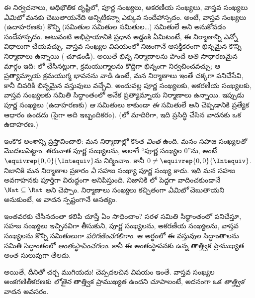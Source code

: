 \documentclass[../../../include/open-logic-section]{subfiles}
\begin{document}
ఈ నిర్వచనాలు, అధిభౌతిక దృష్టిలో, పూర్ణ సంఖ్యలు, అకరణీయ సంఖ్యలు,
వాస్తవ సంఖ్యలు \emph{ఏమిటో} మనకు చెబుతాయనేది అన్నిటికన్నా ఎక్కువ
సందేహాస్పదం. అంటే, వాస్తవ సంఖ్యలు (ఉదాహరణకు) కొన్ని (సమితుల సమితుల
సమితుల\ldots) సమితులే అని అనుకోవడం సందేహాస్పదం. అటువంటి అభిప్రాయానికి
ప్రధాన అడ్డంకి ఏమిటంటే, ఈ నిర్మాణాన్ని ఎన్నో విధాలుగా
చేయవచ్చు. వాస్తవ సంఖ్యల విషయంలో నిజంగానే ఆసక్తికరంగా భిన్నమైన కొన్ని
నిర్మాణాలు ఉన్నాయి ( చూడండి). అయితే భిన్న నిర్మాణాలను
పొందే అతి సాధారణమైన మార్గం ఇది: లో
చేసినట్లుగా, క్రమయుగ్మాలను కొద్దిగా భిన్నంగా నిర్వచించవచ్చు; ఆ ప్రత్యామ్నాయ
క్రమయుగ్మ భావనను వాడి ఉంటే, మన నిర్మాణాలు ఇంతే చక్కగా పనిచేసేవి,
కానీ చివరికి భిన్నమైన వస్తువులు వచ్చేవి. అందువల్ల పూర్ణ సంఖ్యలకు, అకరణీయ సంఖ్యలకు,
వాస్తవ సంఖ్యలకు సమితి సిద్ధాంతంలో అనేక ప్రత్యామ్నాయ నిర్మాణాలు ఉన్నాయి. ఇప్పుడు
పూర్ణ సంఖ్యలు (ఉదాహరణకు) \emph{ఆ} సమితులు కాకుండా \emph{ఈ} సమితులే
అని చెప్పడానికి ప్రత్యేక ఆధారం ఉండదు (పైగా అది ఇబ్బందికరం).
(లో మాదిరిగా, ఇది
\citealt{Benacerraf1965} ప్రసిద్ధి చేసిన వాదనకు ఒక ఉదాహరణ.)

ఇంకొక అంశాన్ని ప్రస్తావించాలి: మన నిర్మాణాల్లో కొంత \emph{వింత} ఉంది.
మనం సహజ సంఖ్యలతో మొదలుపెట్టాం. తరువాత పూర్ణ సంఖ్యలను, అలాగే
``పూర్ణ సంఖ్యల $0$''ను, అంటే $ \equivrep{0,0}{\Intequiv}$ను నిర్మించాం.
కానీ $0 \neq \equivrep{0,0}{\Intequiv}$. నిజానికి మన నిర్మాణాల ప్రకారం
\emph{ఏ} సహజ సంఖ్యా పూర్ణ సంఖ్య కాదు. ఇది మన సహజ అవగాహనకు పూర్తిగా
విరుద్ధంగా అనిపిస్తుంది. నిజానికి లో పెద్దగా
వాదించకుండానే $\Nat \subseteq \Rat$ అని చెప్పాం. నిర్మాణాలు సంఖ్యలు
కచ్చితంగా \emph{ఏమిటో} చెబుతాయని అనుకుంటే, ఆ వాదన స్పష్టంగానే అసత్యం.

ఇంతవరకు చేసినదంతా కలిపి చూస్తే ఏం సాధించాం? సరళ సమితి
సిద్ధాంతంలో పనిచేస్తూ, సహజ సంఖ్యలు ఇచ్చినవిగా తీసుకుని,
పూర్ణ సంఖ్యలను, అకరణీయ సంఖ్యలను, వాస్తవ సంఖ్యలను కొన్ని సమితులుగా \emph{పరిగణించగలిగాం}.
ఆ అర్థంలో ఈ వస్తువుల సిద్ధాంతాలను సమితి సిద్ధాంతంలో
\emph{అంతఃస్థాపించగలం}. కానీ ఈ అంతఃస్థాపనకు ఉన్న తాత్త్విక ప్రాముఖ్యత
అంత సులువుగా తేలదు.

అయితే, దీనితో చర్చ ముగియదు!{} చెప్పదలచిన విషయం ఇంతే. వాస్తవ సంఖ్యల
అంకగణితీకరణకు \emph{లోతైన} తాత్త్విక ప్రాముఖ్యత ఉందని చూపాలంటే,
అదనంగా ఒక \emph{తాత్త్విక} వాదన అవసరం.

\end{document}
